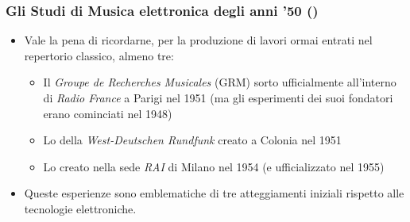 \begin{frame}
    \frametitle{\normalsize Gli Studi di Musica elettronica degli anni '50 ()}

    \begin{itemize}
        \item Vale la pena di ricordarne, per la produzione di lavori ormai entrati
            nel repertorio classico, almeno tre:

            \begin{itemize}

            \item Il \emph{Groupe de Recherches Musicales} (GRM)
                sorto ufficialmente all'interno di \emph{Radio France} a Parigi
                nel 1951 (ma gli esperimenti dei suoi fondatori erano cominciati nel 1948)

            \item Lo \sem della \emph{West-Deutschen Rundfunk}
                creato a Colonia nel 1951

            \item Lo \sfm creato nella sede \emph{RAI} di Milano
                nel 1954 (e ufficializzato nel 1955)

            \end{itemize}
        
        \item Queste esperienze sono emblematiche di tre atteggiamenti iniziali
            rispetto alle tecnologie elettroniche.

    \end{itemize}

\end{frame}
